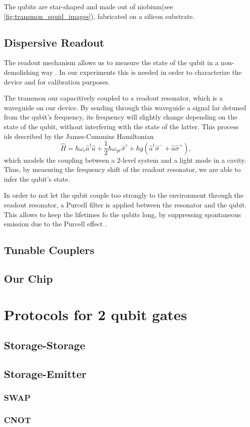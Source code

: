 \documentclass[12pt,a4paper]{report}
\begin{document}
The qubits are star-shaped and made out of niobium(see \cref{fig:transmon_squid_images}), fabricated on a silicon substrate.

\section{Dispersive Readout}
\label{sec:readout}

The readout mechanism allows us to measure the state of the qubit in a non-demolishing way \cite{singleshot_readout}.
In our experiments this is needed in order to characterize the device and for calibration purposes.

The transmon our capacitively coupled to a readout resonator, which is a waveguide on our device.
By sending through this waveguide a signal far detuned from the qubit's frequency, its frequency will slightly change depending on the state of the qubit, without interfering with the state of the latter.
This process ids described by the James-Cummins Hamiltonian
\begin{equation}
    \hat{H} = \hbar \omega_r \hat{a}^\dagger \hat{a} + \frac{1}{2} \hbar \omega_{ge} \hat{\sigma}^z + \hbar g (\hat{a}^\dagger \hat{\sigma}^- + \hat{a} \hat{\sigma}^+) ,
\end{equation}
which models the coupling between a 2-level system and a light mode in a cavity.
Thus, by measuring the frequency shift of the readout resonator, we are able to infer the qubit's state.

In order to not let the qubit couple too strongly to the environment through the readout resonator, a Purcell filter is applied between the resonator and the qubit.
This allows to keep the lifetimes fo the qubits long, by suppressing spontaneous emission due to the Purcell effect \cite{Purcell_effect}.

\section{Tunable Couplers}
\section{Our Chip}
\label{sec:our_setup}

\chapter{Protocols for 2 qubit gates}
\section{Storage-Storage}
\section{Storage-Emitter}
\subsection{SWAP}
\subsection{CNOT}

\printbibliography[heading=bibintoc]
\end{document}
